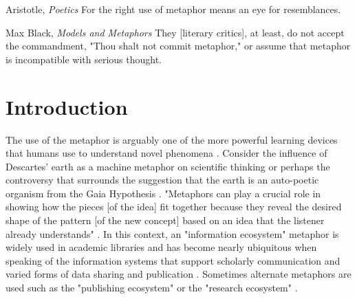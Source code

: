 \clearpage

\begin{epigraph}{Aristotle, \textit{Poetics}}
For the right use of metaphor means an eye for resemblances.
\end{epigraph}
\begin{epigraph}{Max Black, \textit{Models and Metaphors}}
They [literary critics], at least, do not accept the commandment, "Thou shalt not commit metaphor," or assume that metaphor is incompatible with serious thought.
\end{epigraph}

\section{Introduction}

The use of the metaphor is arguably one of the more powerful learning devices that humans use to understand novel phenomena \citep{livingstone_1981,anderson_2016}. Consider the influence of Descartes' earth as a machine metaphor on scientific thinking \citep{abram_1991} or perhaps the controversy that surrounds the suggestion that the earth is an auto-poetic organism from the Gaia Hypothesis \citep{lovelock_1974}. "Metaphors can play a crucial role in showing how the pieces [of the idea] fit together because they reveal the desired shape of the pattern [of the new concept] based on an idea that the listener already understands" \citep{anderson_2016}. In this context, an "information ecosystem" metaphor is widely used in academic libraries and has become nearly ubiquitous when speaking of the information systems that support scholarly communication and varied forms of data sharing and publication \citep[for example see][]{walter_2008}. Sometimes alternate metaphors are used such as the "publishing ecosystem" or the "research ecosystem" \citep[for respective examples see][]{esposito_2013,dylla_2016}. 


